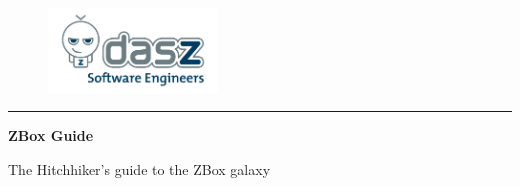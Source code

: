 \begin{figure}
	\includegraphics[width=0.4\textwidth]{images/logo.jpg}
\end{figure}
\hrule

\vspace*{1.5cm}

\begin{center}
 {\huge \bf ZBox Guide }
\end{center}

\vspace*{1cm}

\begin{center}
{\huge The Hitchhiker's guide to the ZBox galaxy }
\end{center}


